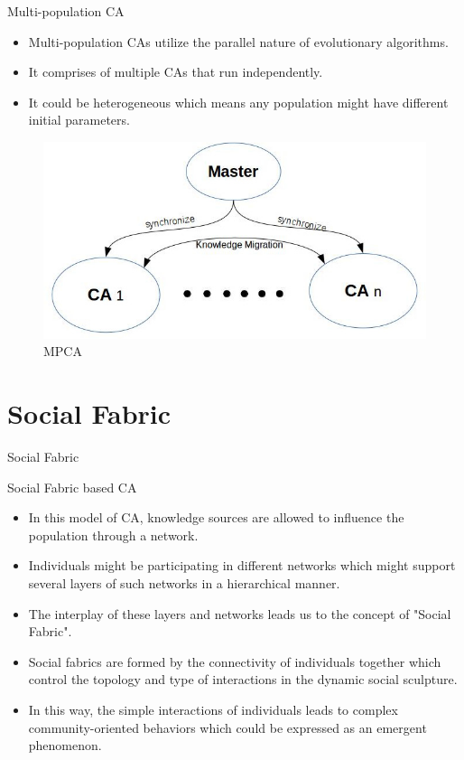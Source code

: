 \documentclass[table]{beamer}
\begin{document}
	\begin{frame}{Multi-population CA}
		\begin{block}{}
			\begin{itemize}
				\item Multi-population CAs utilize the parallel nature of evolutionary algorithms. \cite{guo2011novel}
				\item It comprises of multiple CAs that run independently.
				\item It could be heterogeneous which means any population might have different initial parameters. \cite{kobti2013heterogeneous}
			\end{itemize}
		\end{block}
		\begin{figure}[v]
			\includegraphics[scale=0.5]{mpca}
			\centering
			\caption{MPCA}
			\label{ref:mpca}
		\end{figure}
	\end{frame}
	
	\section{Social Fabric}
	
	\begin{frame}{Social Fabric}
		\begin{block}{Social Fabric based CA}
			\begin{itemize}
				\item In this model of CA, knowledge sources are allowed to influence the population through a network.
				\item Individuals might be participating in different networks which might support several layers of such networks in a hierarchical manner.
				\item The interplay of these layers and networks leads us to the concept of "\alert{Social Fabric}". \cite{reynolds2008computing}
				\item Social fabrics are formed by the connectivity of individuals together which control the topology and type of interactions in the dynamic social sculpture. 
				\item In this way, the simple interactions of individuals leads to complex community-oriented behaviors which could be expressed as an emergent phenomenon.
			\end{itemize}
		\end{block}
	\end{frame}
	
\end{document}
